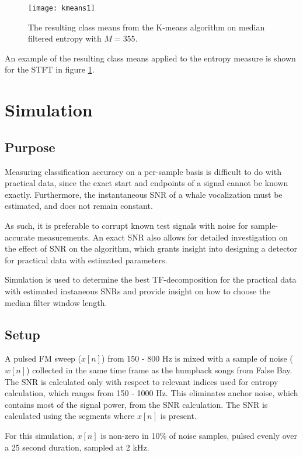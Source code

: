 \begin{figure}[h!]
	\centering
	\texttt{[image: kmeans1]}
	\caption[K-means class means on entropy.]{The resulting class means from the K-means algorithm on median filtered entropy with $M=355$.}
	\label{fig:kmeans1}
\end{figure}

An example of the resulting class means applied to the entropy measure is shown for the STFT in figure \ref{fig:kmeans1}.

\section{Simulation}

\subsection{Purpose}
Measuring classification accuracy on a per-sample basis is difficult to do with practical data, since the exact start and endpoints of a signal cannot be known exactly. Furthermore, the instantaneous SNR of a whale vocalization must be estimated, and does not remain constant.

As such, it is preferable to corrupt known test signals with noise for sample-accurate measurements. An exact SNR also allows for detailed investigation on the effect of SNR on the algorithm, which grants insight into designing a detector for practical data with estimated parameters.

Simulation is used to determine the best TF-decomposition for the practical data with estimated instaneous SNRs and provide insight on how to choose the median filter window length.

\subsection{Setup}
A pulsed FM sweep ($x[n]$) from 150 - 800 Hz is mixed with a sample of noise ($w[n]$) collected in the same time frame as the humpback songs from False Bay. The SNR is calculated only with respect to relevant indices used for entropy calculation, which ranges from 150 - 1000 Hz.  This eliminates anchor noise, which contains most of the signal power, from the SNR calculation. The SNR is calculated using the segments where $x[n]$ is present.
 
For this simulation, $x[n]$ is non-zero in 10\% of noise samples, pulsed evenly over a 25 second duration, sampled at 2 kHz. 
 
